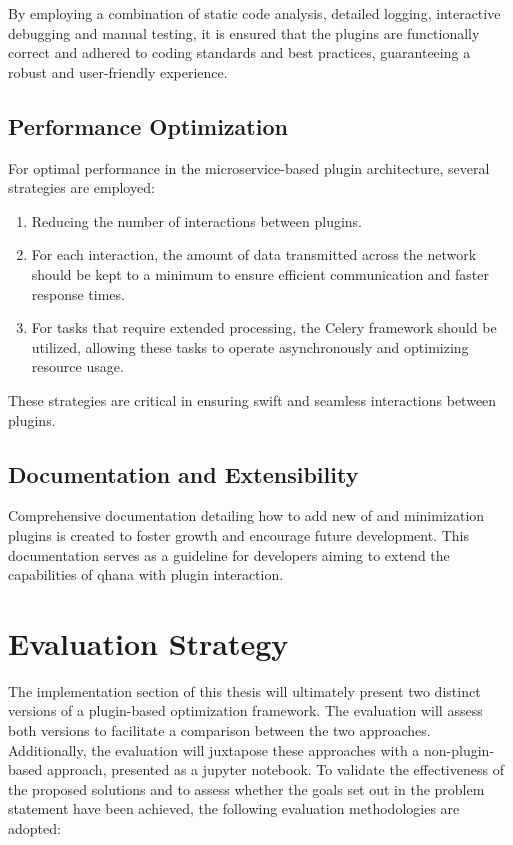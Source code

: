 \documentclass[
  a4paper,  %
  twoside,  %
  bibliography=totoc,
  headsepline,
  cleardoublepage=empty,
  parskip=half,
  draft=false
]{scrbook}
\begin{document}
By employing a combination of static code analysis, detailed logging, interactive debugging and manual testing, it is ensured that the plugins are functionally correct and adhered to coding standards and best practices, guaranteeing a robust and user-friendly experience.


\subsection{Performance Optimization}
For optimal performance in the microservice-based plugin architecture, several strategies are employed:

\begin{enumerate}
    \item Reducing the number of interactions between plugins.
    \item For each interaction, the amount of data transmitted across the network should be kept to a minimum to ensure efficient communication and faster response times.
    \item For tasks that require extended processing, the Celery framework should be utilized, allowing these tasks to operate asynchronously and optimizing resource usage.
\end{enumerate}

These strategies are critical in ensuring swift and seamless interactions between plugins.


\subsection{Documentation and Extensibility}
Comprehensive documentation detailing how to add new \gls{of} and minimization plugins is created to foster growth and encourage future development.
This documentation serves as a guideline for developers aiming to extend the capabilities of \gls{qhana} with plugin interaction.


\section{Evaluation Strategy}
\label{sec:evaluationStrategy}

The implementation section of this thesis will ultimately present two distinct versions of a plugin-based optimization framework.
The evaluation will assess both versions to facilitate a comparison between the two approaches.
Additionally, the evaluation will juxtapose these approaches with a non-plugin-based approach, presented as a jupyter notebook.
To validate the effectiveness of the proposed solutions and to assess whether the goals set out in the problem statement have been achieved, the following evaluation methodologies are adopted:
\end{document}
